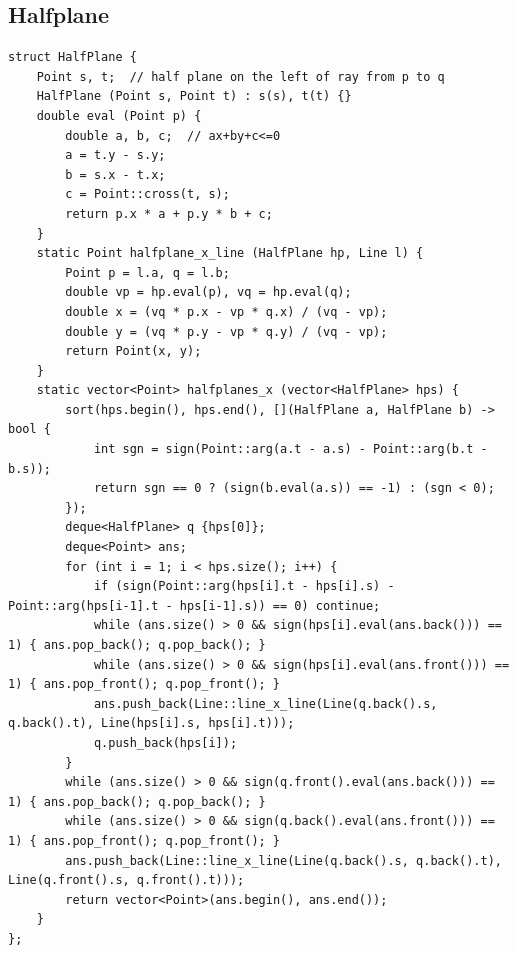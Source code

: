 \documentclass[10pt,letterpaper,landscape]{article}
\begin{document}
\begin{multicols}{2}
\subsection{Halfplane}
\begin{lstlisting}
struct HalfPlane {
	Point s, t;  // half plane on the left of ray from p to q
	HalfPlane (Point s, Point t) : s(s), t(t) {}
	double eval (Point p) {
		double a, b, c;  // ax+by+c<=0
		a = t.y - s.y;
		b = s.x - t.x;
		c = Point::cross(t, s);
		return p.x * a + p.y * b + c;
	}
	static Point halfplane_x_line (HalfPlane hp, Line l) {
		Point p = l.a, q = l.b;
		double vp = hp.eval(p), vq = hp.eval(q);
		double x = (vq * p.x - vp * q.x) / (vq - vp);
		double y = (vq * p.y - vp * q.y) / (vq - vp);
		return Point(x, y);
	}
	static vector<Point> halfplanes_x (vector<HalfPlane> hps) {
		sort(hps.begin(), hps.end(), [](HalfPlane a, HalfPlane b) -> bool {
			int sgn = sign(Point::arg(a.t - a.s) - Point::arg(b.t - b.s));
			return sgn == 0 ? (sign(b.eval(a.s)) == -1) : (sgn < 0);
		});
		deque<HalfPlane> q {hps[0]};
		deque<Point> ans;
		for (int i = 1; i < hps.size(); i++) {
			if (sign(Point::arg(hps[i].t - hps[i].s) - Point::arg(hps[i-1].t - hps[i-1].s)) == 0) continue;
			while (ans.size() > 0 && sign(hps[i].eval(ans.back())) == 1) { ans.pop_back(); q.pop_back(); }
			while (ans.size() > 0 && sign(hps[i].eval(ans.front())) == 1) { ans.pop_front(); q.pop_front(); }
			ans.push_back(Line::line_x_line(Line(q.back().s, q.back().t), Line(hps[i].s, hps[i].t)));
			q.push_back(hps[i]);
		}
		while (ans.size() > 0 && sign(q.front().eval(ans.back())) == 1) { ans.pop_back(); q.pop_back(); }
		while (ans.size() > 0 && sign(q.back().eval(ans.front())) == 1) { ans.pop_front(); q.pop_front(); }
		ans.push_back(Line::line_x_line(Line(q.back().s, q.back().t), Line(q.front().s, q.front().t)));
		return vector<Point>(ans.begin(), ans.end());
	}
};
\end{lstlisting}

\end{multicols}
\end{document}
